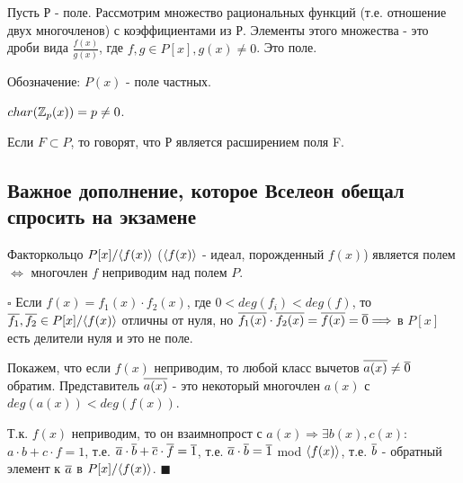 \documentclass[../main.tex]{subfiles}
\begin{document}
    \void{} Пусть Р - поле. Рассмотрим множество рациональных функций
    (т.е. отношение двух многочленов) с коэффициентами из Р. Элементы этого множества
    - это дроби вида $\frac{f(x)}{g(x)}$, где $f,g\in P[x], g(x)\neq 0$. Это поле.

    Обозначение: $P(x)$ - поле частных.

    \void{} $char(\mathbb{Z}_p(x)) = p\neq 0$.

    \void{} Если $F\subset P$, то говорят, что Р является расширением поля F.

    \void\void\void
    \subsection{Важное дополнение, которое Вселеон обещал спросить на экзамене}

    \void{} Факторкольцо $P[x]/\langle f(x)\rangle$ 
    ($\langle f(x)\rangle$ - идеал, порожденный $f(x)$) является полем
    $\Longleftrightarrow$ многочлен $f$ неприводим над полем $P$.

    \void
    $\square$ Если $f(x) = f_1(x)\cdot f_2(x)$, где $0 < deg(f_i) < deg(f)$, то
    $\overline{f_1}, \overline{f_2}\in P[x]/\langle f(x)\rangle$ отличны от нуля, но
    $\overline{f_1(x)}\cdot \overline{f_2(x)} = \overline{f(x)} = \overline{0} \Longrightarrow$
    в $P[x]$ есть делители нуля и это не поле.

    Покажем, что если $f(x)$ неприводим, то любой класс вычетов $\overline{a(x)}\neq \overline{0}$ обратим.
    Представитель $\overline{a(x)}$ - это некоторый многочлен $a(x)$ с $deg(a(x)) < deg(f(x))$.

    Т.к. $f(x)$ неприводим, то он взаимнопрост с $a(x) \Longrightarrow \exists b(x),c(x):$
    $a\cdot b + c\cdot f = 1$, т.е. $\overline{a}\cdot\overline{b}+\overline{c}\cdot\overline{f}=\overline{1}$, т.е.
    $\overline{a}\cdot\overline{b}=\overline{1}$ mod $\langle f(x)\rangle$, т.е. $\overline{b}$ - обратный элемент к $\overline{a}$
    в $P[x]/\langle f(x)\rangle$. $\blacksquare$
\end{document}
